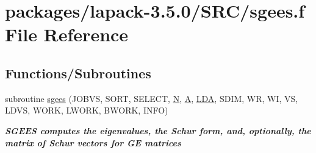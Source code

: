 \hypertarget{sgees_8f}{}\section{packages/lapack-\/3.5.0/\+S\+R\+C/sgees.f File Reference}
\label{sgees_8f}
\subsection*{Functions/\+Subroutines}
\begin{DoxyCompactItemize}
\item 
subroutine \hyperlink{group__realGEeigen_ga0cd2fba843c9d04967c79a58f8d6e321}{sgees} (J\+O\+B\+V\+S, S\+O\+R\+T, S\+E\+L\+E\+C\+T, \hyperlink{polmisc_8c_a0240ac851181b84ac374872dc5434ee4}{N}, \hyperlink{classA}{A}, \hyperlink{example__user_8c_ae946da542ce0db94dced19b2ecefd1aa}{L\+D\+A}, S\+D\+I\+M, W\+R, W\+I, V\+S, L\+D\+V\+S, W\+O\+R\+K, L\+W\+O\+R\+K, B\+W\+O\+R\+K, I\+N\+F\+O)
\begin{DoxyCompactList}\small\item\em {\bfseries  S\+G\+E\+E\+S computes the eigenvalues, the Schur form, and, optionally, the matrix of Schur vectors for G\+E matrices} \end{DoxyCompactList}\end{DoxyCompactItemize}
